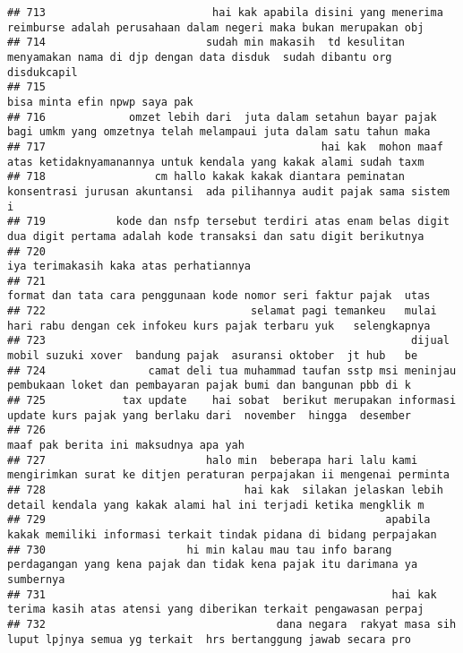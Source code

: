 \documentclass[
]{article}
\begin{document}
\begin{verbatim}
## 713                          hai kak apabila disini yang menerima reimburse adalah perusahaan dalam negeri maka bukan merupakan obj 
## 714                         sudah min makasih  td kesulitan menyamakan nama di djp dengan data disduk  sudah dibantu org disdukcapil
## 715                                                                                                   bisa minta efin npwp saya pak 
## 716             omzet lebih dari  juta dalam setahun bayar pajak  bagi umkm yang omzetnya telah melampaui juta dalam satu tahun maka
## 717                                           hai kak  mohon maaf atas ketidaknyamanannya untuk kendala yang kakak alami sudah taxm 
## 718                 cm hallo kakak kakak diantara peminatan konsentrasi jurusan akuntansi  ada pilihannya audit pajak sama sistem i 
## 719           kode dan nsfp tersebut terdiri atas enam belas digit dua digit pertama adalah kode transaksi dan satu digit berikutnya
## 720                                                                                           iya terimakasih kaka atas perhatiannya
## 721                                                              format dan tata cara penggunaan kode nomor seri faktur pajak  utas 
## 722                                selamat pagi temankeu   mulai hari rabu dengan cek infokeu kurs pajak terbaru yuk   selengkapnya 
## 723                                                         dijual mobil suzuki xover  bandung pajak  asuransi oktober  jt hub   be 
## 724                camat deli tua muhammad taufan sstp msi meninjau pembukaan loket dan pembayaran pajak bumi dan bangunan pbb di k 
## 725            tax update    hai sobat  berikut merupakan informasi update kurs pajak yang berlaku dari  november  hingga  desember 
## 726                                                                                          maaf pak berita ini maksudnya apa yah  
## 727                         halo min  beberapa hari lalu kami mengirimkan surat ke ditjen peraturan perpajakan ii mengenai perminta 
## 728                               hai kak  silakan jelaskan lebih detail kendala yang kakak alami hal ini terjadi ketika mengklik m 
## 729                                                     apabila kakak memiliki informasi terkait tindak pidana di bidang perpajakan 
## 730                      hi min kalau mau tau info barang perdagangan yang kena pajak dan tidak kena pajak itu darimana ya sumbernya
## 731                                                      hai kak  terima kasih atas atensi yang diberikan terkait pengawasan perpaj 
## 732                                    dana negara  rakyat masa sih luput lpjnya semua yg terkait  hrs bertanggung jawab secara pro 

\end{verbatim}
\end{document}
